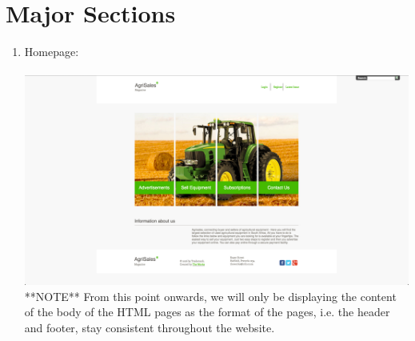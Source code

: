 \documentclass[11pt]{article}
\begin{document}


\tableofcontents

\newpage

\section{Major Sections}
	\begin{enumerate}
		\item Homepage: \\ \\
			\includegraphics[width=\textwidth]{../Images/Pages/Homepage} \\
			
			**NOTE** From this point onwards, we will only be displaying the content of the body of the HTML pages as the format of the pages, i.e. the header and footer, stay consistent throughout the website.
			

\end{enumerate}
\end{document}
